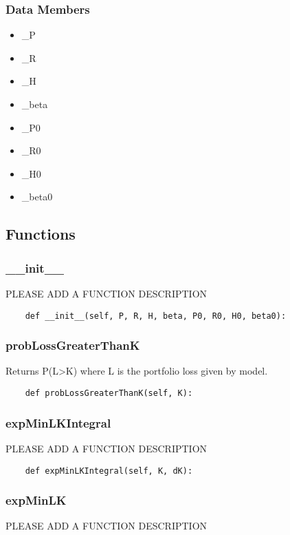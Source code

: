 \documentclass[twoside,11pt]{book}
\begin{document}
\subsubsection*{Data Members}
\begin{itemize}
\item{\_P}
\item{\_R}
\item{\_H}
\item{\_beta}
\item{\_P0}
\item{\_R0}
\item{\_H0}
\item{\_beta0}
\end{itemize}

\subsection*{Functions}

\subsubsection*{{\bf \_\_init\_\_}}
PLEASE ADD A FUNCTION DESCRIPTION

\begin{lstlisting}
    def __init__(self, P, R, H, beta, P0, R0, H0, beta0):
\end{lstlisting}

\subsubsection*{{\bf probLossGreaterThanK}}
Returns P(L>K) where L is the portfolio loss given by model.  

\begin{lstlisting}
    def probLossGreaterThanK(self, K):
\end{lstlisting}

\subsubsection*{{\bf expMinLKIntegral}}
PLEASE ADD A FUNCTION DESCRIPTION

\begin{lstlisting}
    def expMinLKIntegral(self, K, dK):
\end{lstlisting}

\subsubsection*{{\bf expMinLK}}
PLEASE ADD A FUNCTION DESCRIPTION
\end{document}
